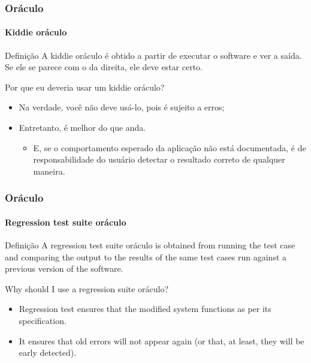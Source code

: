 \begin{frame}
\label{concept:kiddie-oracle}
\frametitle{Oráculo}
\framesubtitle{Kiddie oráculo}

\begin{block:concept}{Definição}
A kiddie oráculo é obtido a partir de executar o software e ver a saída. Se ele se parece com o da direita, ele deve estar certo.
\end{block:concept}

\begin{block:fact}{Por que eu deveria usar um kiddie oráculo?}
\begin{itemize}
	\item Na verdade, você não deve usá-lo, pois é sujeito a erros;

	\item Entretanto, é melhor do que anda.
	\begin{itemize}
		\item E, se o comportamento esperado da aplicação não está documentada, é de responsabilidade do usuário detectar o resultado correto de qualquer maneira.
	\end{itemize}
\end{itemize}
\end{block:fact}

\hfill
{}
\end{frame}



\begin{frame}
\label{concept:regression-test-suite-oracle}
\frametitle{Oráculo}
\framesubtitle{Regression test suite oráculo}

\begin{block:concept}{Definição}
A regression test suite oráculo  is obtained from running the test case and
comparing the output to the results of the same test cases run against a
previous version of the software.
\end{block:concept}

\begin{block:fact}{Why should I use a regression suite oráculo?}
\begin{itemize}
	\item Regression test ensures that the modified system functions as per
	its specification.

	\item It ensures that old errors will not appear again (or that, at least,
	they will be early detected).
\end{itemize}
\end{block:fact}

\hfill
{}
\end{frame}



